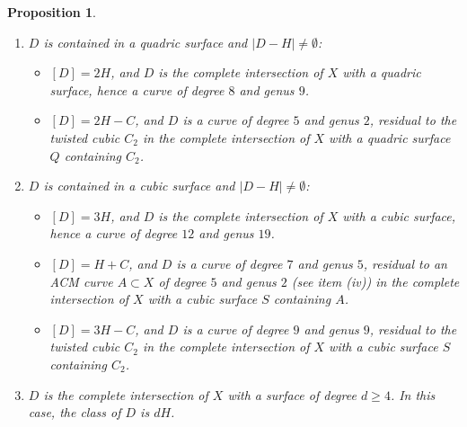 \documentclass[12pt,reqno]{amsart}
\theoremstyle{plain}
\newtheorem{prop}[theorem]{Proposition}
\theoremstyle{definition}
\theoremstyle{remark}
\theoremstyle{definition}
\begin{document}
\begin{prop}
\begin{enumerate}[label=(\roman*)]
    \item $D$ is contained in a quadric surface and $|D-H| \neq \emptyset$:
    \begin{itemize}
        \item[(a)] $[D] = 2H$, and $D$ is the complete intersection of $X$ with a quadric surface, hence a curve of degree $8$ and genus $9$.
        \item[(b)] $[D] = 2H - C$, and $D$ is a curve of degree $5$ and genus $2$, residual to the twisted cubic $C_{2}$ in the complete intersection of $X$ with a quadric surface $Q$ containing $C_{2}$.
    \end{itemize}

    \item $D$ is contained in a cubic surface and $|D-H| \neq \emptyset$:
    \begin{itemize}
        \item[(a)] $[D] = 3H$, and $D$ is the complete intersection of $X$ with a cubic surface, hence a curve of degree $12$ and genus $19$.
        \item[(b)] $[D] = H + C$, and $D$ is a curve of degree $7$ and genus $5$, residual to an ACM curve $A \subset X$ of degree $5$ and genus $2$ (see item (iv)) in the complete intersection of $X$ with a cubic surface $S$ containing $A$.
        \item[(c)] $[D] = 3H - C$, and $D$ is a curve of degree $9$ and genus $9$, residual to the twisted cubic $C_{2}$ in the complete intersection of $X$ with a cubic surface $S$ containing $C_{2}$.
    \end{itemize}

    \item $D$ is the complete intersection of $X$ with a surface of degree $d \geq 4$. In this case, the class of $D$ is $dH$.
\end{enumerate}
\end{prop}
\end{document}

